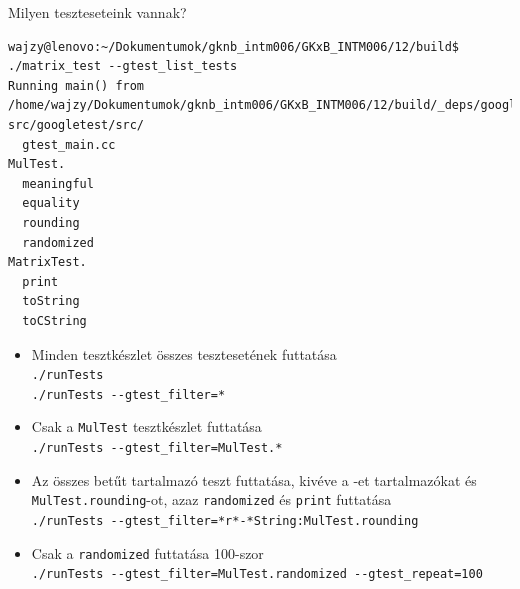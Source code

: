 \begin{frame}[fragile]
  \begin{block}{Milyen teszteseteink vannak?}
    \tiny
    \begin{verbatim}
wajzy@lenovo:~/Dokumentumok/gknb_intm006/GKxB_INTM006/12/build$ ./matrix_test --gtest_list_tests
Running main() from /home/wajzy/Dokumentumok/gknb_intm006/GKxB_INTM006/12/build/_deps/googletest-src/googletest/src/
  gtest_main.cc
MulTest.
  meaningful
  equality
  rounding
  randomized
MatrixTest.
  print
  toString
  toCString
\end{verbatim}
  \end{block}
\end{frame}

\begin{frame}
  \begin{itemize}
    \item Minden tesztkészlet összes tesztesetének futtatása \\ \texttt{./runTests} \\ \texttt{./runTests 
{-}-gtest\_filter=*}
    \item Csak a \texttt{MulTest} tesztkészlet futtatása \\ \texttt{./runTests {-}-gtest\_filter=MulTest.*}
    \item Az összes  betűt tartalmazó teszt futtatása, kivéve a -et tartalmazókat és 
\texttt{MulTest.rounding}-ot, azaz \texttt{randomized} és \texttt{print} futtatása \\ \texttt{./runTests 
{-}-gtest\_filter=*r*-*String:MulTest.rounding}
    \item Csak a \texttt{randomized} futtatása 100-szor \\ \texttt{./runTests {-}-gtest\_filter=MulTest.randomized 
{-}-gtest\_repeat=100}
  \end{itemize}
\end{frame}
  
